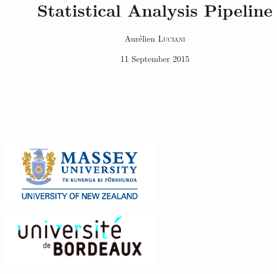\documentclass[10pt, aspectratio=43]{beamer}
\title{Statistical Analysis Pipeline}
\author{Aurélien \textsc{Luciani}}
\institute{Université de Bordeaux}
\date{11 September 2015}
\begin{document}



\begin{frame}[t, noframenumbering]  %
\masseyTitlepage

\raggedleft
\begin{mblock}[140pt]{0.7}{}
\raggedleft
\textbf{\insertauthor}\\
\insertdepartment\\
\insertinstitute\\
\insertdate
\end{mblock}
\vfill
\begin{mblock}[300pt]{0.7}{}
\includegraphics[width=0.5\textwidth]{uniLogo/MasseyLogoBlueLetters.png}%
\includegraphics[width=0.5\textwidth]{../data/ub.jpg}
\end{mblock}
\end{frame}

\end{document}

